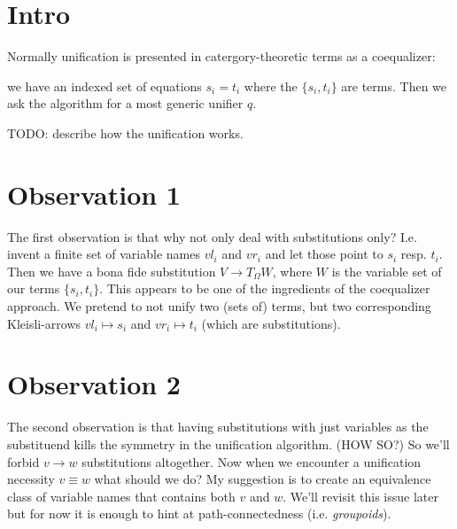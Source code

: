 \documentclass{article}
\begin{document}
\section {Intro}
Normally unification is presented in catergory-theoretic terms as a coequalizer:

we have an indexed set of equations $s_i = t_i$ where the $\{s_i, t_i\}$ are terms.
Then we ask the algorithm for a most generic unifier $q$.

TODO: describe how the unification works.

\section {Observation 1}
The first observation is that why not only deal with substitutions only? I.e. invent a finite set of variable names $vl_i$ and $vr_i$ and let those point to $s_i$ resp. $t_i$. Then we have a bona fide substitution $V \to T_{\Omega}W$, where $W$ is the variable set of our terms $\{s_i, t_i\}$. This appears to be one of the ingredients of the coequalizer approach. We pretend to not unify two (sets of) terms, but two corresponding Kleisli-arrows $vl_i \mapsto s_i$ and $vr_i \mapsto t_i$ (which are substitutions).

\section {Observation 2}
The second observation is that having substitutions with just variables as the substituend kills the symmetry in the unification algorithm. (HOW SO?) So we'll forbid $v \to w$ substitutions altogether. Now when we encounter a unification necessity $v \equiv w$ what should we do?
My suggestion is to create an equivalence class of variable names that contains both $v$ and $w$. We'll revisit this issue later but for now it is enough to hint at path-connectedness (i.e. \emph{groupoids}).
\end{document}

